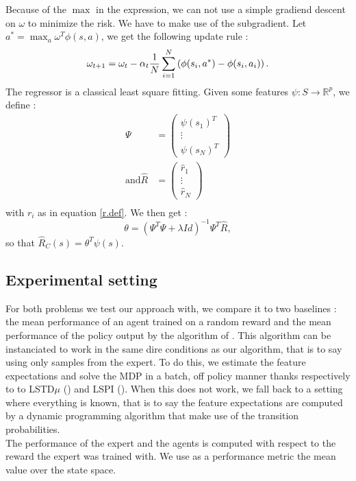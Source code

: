 \documentclass{article} %
\newcommand{\0}{\mathbf{0}}
\newcommand{\1}{\mathbf{1}}
\begin{document}
Because of the $\max$ in the expression, we can not use a simple gradiend descent on $\omega$ to minimize the risk. We have to make use of the subgradient. Let $a^* = \max_a\omega^T\phi(s,a)$, we get the following update rule :
\begin{equation}
  \omega_{t+1} = \omega_t -\alpha_t{1\over N}\sum_{i=1}^N\left(\phi(s_i,a^*) - \phi(s_i,a_i)\right).
\end{equation}
The regressor is a classical least square fitting. Given some features $\psi : S\rightarrow \mathbb{R}^p$, we define :
\begin{eqnarray}
\Psi &= \begin{pmatrix}\psi(s_1)^T\\\vdots\\\psi(s_N)^T\end{pmatrix}\\
\textrm{and}
\hat R &= \begin{pmatrix}\hat r_1 \\\vdots\\\hat r_N\end{pmatrix}\\
\end{eqnarray}
with $r_i$ as in equation \ref{r.def}. We then get :
\begin{equation}
\theta = (\Psi^T\Psi + \lambda Id)^{-1}\Psi^T\hat R,
\end{equation}
so that $\hat R_C(s) = \theta^T \psi(s)$.\\
\subsection{Experimental setting}
For both problems we test our approach with, we compare it to two baselines : the mean performance of an agent trained on a random reward and the mean performance of the policy output by the algorithm of \cite{abbeel2004apprenticeship}. This algorithm can be instanciated to work in the same dire conditions as our algorithm, that is to say using only samples from the expert. To do this, we estimate the feature expectations and solve the MDP in a batch, off policy manner thanks respectively to to LSTD$\mu$ (\cite{klein2011batch}) and LSPI (\cite{lagoudakis2003least}). When this does not work, we fall back to a setting where everything is known, that is to say the feature expectations are computed by a dynamic programming algorithm that make use of the transition probabilities.\\
The performance of the expert and the agents is computed with respect to the reward the expert was trained with. We use as a performance metric the mean value over the state space.
\end{document}
